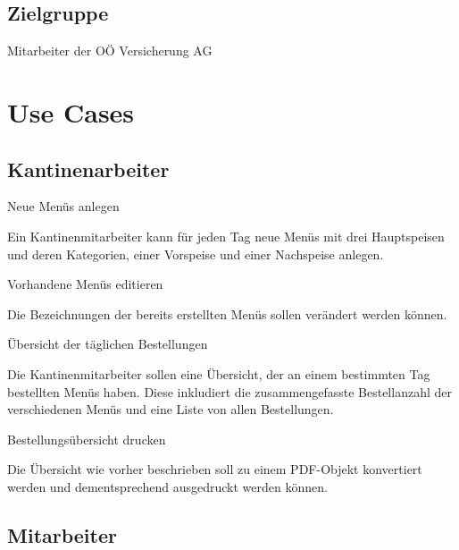 \subsection{Zielgruppe}
Mitarbeiter der OÖ Versicherung AG

\section{Use Cases}

\subsection{Kantinenarbeiter}

\begin{compactitem}
    \item Neue Menüs anlegen
    \begin{compactitem}
        \item Ein Kantinenmitarbeiter kann für jeden Tag neue Menüs mit drei Hauptspeisen und deren Kategorien, einer Vorspeise und einer Nachspeise anlegen.
    \end{compactitem}
    \item Vorhandene Menüs editieren
    \begin{compactitem}
        \item Die Bezeichnungen der bereits erstellten Menüs sollen verändert werden können.
    \end{compactitem}
    \item Übersicht der täglichen Bestellungen
    \begin{compactitem}
        \item Die Kantinenmitarbeiter sollen eine Übersicht, der an einem bestimmten Tag bestellten Menüs haben. Diese inkludiert die zusammengefasste Bestellanzahl der verschiedenen Menüs und eine Liste von allen Bestellungen.
    \end{compactitem}
    \item Bestellungsübersicht drucken
    \begin{compactitem}
        \item Die Übersicht wie vorher beschrieben soll zu einem PDF-Objekt konvertiert werden und dementsprechend ausgedruckt werden können.
    \end{compactitem}
\end{compactitem}

\subsection{Mitarbeiter}

